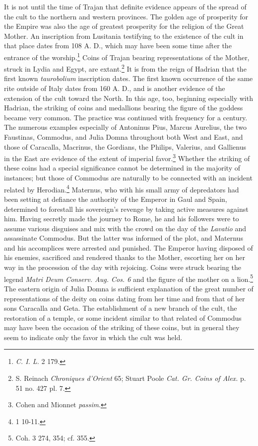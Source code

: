 \documentclass[a4paper, 11pt, oneside, polutonikogreek, english]{article}
\begin{document}
It is not until the time of Trajan that definite evidence appears of the spread of the cult to the northern and western provinces. The golden age of prosperity for the Empire was also the age of greatest prosperity for the religion of the Great Mother. An inscription from Lusitania testifying to the existence of the cult in that place dates from 108 A. D., which may have been some time after the entrance of the worship.\footnote{\emph{C. I. L.} 2 179.} Coins of Trajan bearing representations of the Mother, struck in Lydia and Egypt, are extant.\footnote{S. Reinach \emph{Chroniques d'Orient} 65; Stuart Poole \emph{Cat. Gr. Coins of Alex.} p. 51 no. 427 pl. 7.} It is from the reign of Hadrian that the first known \emph{taurobolium} inscription dates. The first known occurrence of the same rite outside of Italy dates from 160 A. D., and is another evidence of the extension of the cult toward the North. In this age, too, beginning especially with Hadrian, the striking of coins and medallions bearing the figure of the goddess became very common. The practice was continued with frequency for a century. The numerous examples especially of Antoninus Pius, Marcus Aurelius, the two Faustinas, Commodus, and Julia Domna throughout both West and East, and those of Caracalla, Macrinus, the Gordians, the Philips, Valerius, and Gallienus in the East are evidence of the extent of imperial favor.\footnote{Cohen and Mionnet \emph{passim}.} Whether the striking of these coins had a special significance cannot be determined in the majority of instances; but those of Commodus are naturally to be connected with an incident related by Herodian.\footnote{1 10-11.} Maternus, who with his small army of depredators had been setting at defiance the authority of the Emperor in Gaul and Spain, determined to forestall his sovereign's revenge by taking active measures against him. Having secretly made the journey to Rome, he and his followers were to assume various disguises and mix with the crowd on the day of the \emph{Lavatio} and assassinate Commodus. But the latter was informed of the plot, and Maternus and his accomplices were arrested and punished. The Emperor having disposed of his enemies, sacrificed and rendered thanks to the Mother, escorting her on her way in the procession of the day with rejoicing. Coins were struck bearing the legend \emph{Matri Deum Conserv. Aug. Cos. 6} and the figure of the mother on a lion.\footnote{Coh. 3 274, 354; cf. 355.} The eastern origin of Julia Domna is sufficient explanation of the great number of representations of the deity on coins dating from her time and from that of her sons Caracalla and Geta. The establishment of a new branch of the cult, the restoration of a temple, or some incident similar to that related of Commodus may have been the occasion of the striking of these coins, but in general they seem to indicate only the favor in which the cult was held.
\end{document}
